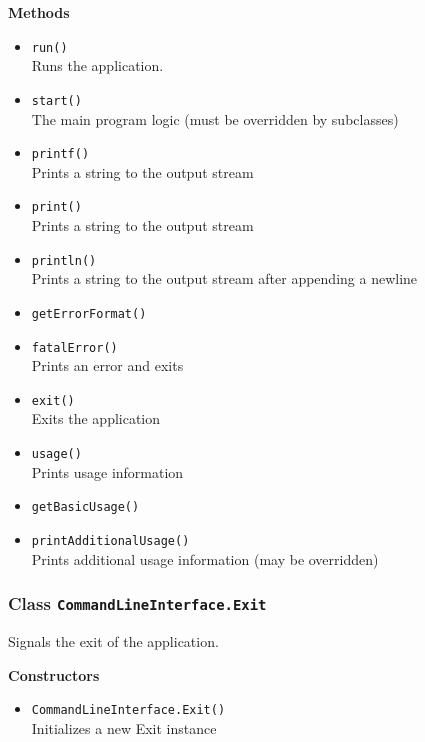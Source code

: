 \textbf{Methods}
\begin{itemize}
\item \lstinline|run()| \\
Runs the application.

\item \lstinline|start()| \\
The main program logic (must be overridden by subclasses)

\item \lstinline|printf()| \\
Prints a string to the output stream

\item \lstinline|print()| \\
Prints a string to the output stream

\item \lstinline|println()| \\
Prints a string to the output stream after appending a newline

\item \lstinline|getErrorFormat()| \\


\item \lstinline|fatalError()| \\
Prints an error and exits

\item \lstinline|exit()| \\
Exits the application

\item \lstinline|usage()| \\
Prints usage information

\item \lstinline|getBasicUsage()| \\


\item \lstinline|printAdditionalUsage()| \\
Prints additional usage information (may be overridden)

\end{itemize}

\subsubsection{Class \lstinline|CommandLineInterface.Exit|}
Signals the exit of the application.

\textbf{Constructors}
\begin{itemize}
\item \lstinline|CommandLineInterface.Exit()| \\
Initializes a new Exit instance

\end{itemize}

